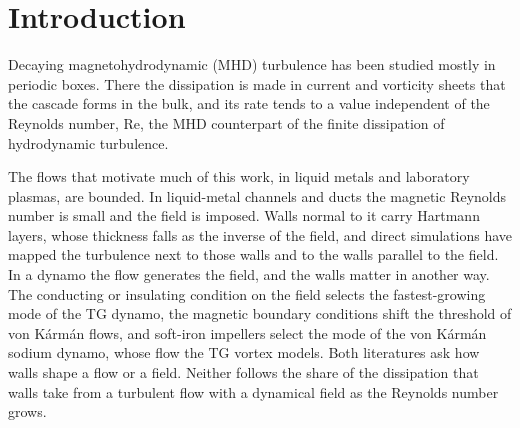 \documentclass[aip,pop,reprint,amsmath,amssymb,superscriptaddress,floatfix]{revtex4-2}
\newcommand{\Rey}{\mathrm{Re}}
\begin{document}
\maketitle

\section{Introduction}
\label{sec:intro}

Decaying magnetohydrodynamic (MHD) turbulence has been studied mostly in periodic
boxes.\cite{biskamp2003,mininni2006,lee2008,pouquet2010,mininni2009,linkmann2015} There the
dissipation is made in current and vorticity sheets that the cascade forms in the
bulk, and its rate tends to a value independent of the Reynolds number,
$\Rey$,\cite{mininni2006,mininni2009,linkmann2015} the MHD counterpart of the finite
dissipation of hydrodynamic turbulence.\cite{sreenivasan1998}

The flows that motivate much of this work, in liquid metals and laboratory plasmas,
are bounded. In liquid-metal channels and ducts the magnetic Reynolds number is small
and the field is imposed. Walls normal to it carry Hartmann layers, whose thickness
falls as the inverse of the field,\cite{sommeria1982,knaepen2008} and direct
simulations have mapped the turbulence next to those walls and to the walls parallel
to the field.\cite{boeck2007,krasnov2012,zikanov2014} In a dynamo the flow generates
the field, and the walls matter in another way. The conducting or insulating
condition on the field selects the fastest-growing mode of the TG
dynamo,\cite{nore1997} the magnetic boundary conditions shift the threshold of von
K\'arm\'an flows,\cite{gissinger2008} and soft-iron impellers select the mode of the
von K\'arm\'an sodium dynamo,\cite{monchaux2007,giesecke2010} whose flow the TG vortex
models.\cite{pouquet2010} Both literatures ask how walls shape a flow or a field.
Neither follows the share of the dissipation that walls take from a turbulent flow
with a dynamical field as the Reynolds number grows.
\end{document}
